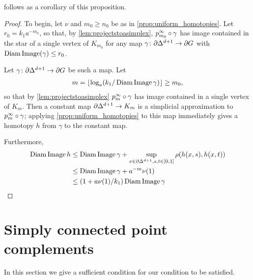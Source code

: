 \documentclass[a4paper]{article}
\begin{document}
 follows as a corollary of this proposition.

\ddagimpliesLCd*

\begin{proof}
  To begin, let $\nu$ and $m_0 \geq n_0$ be as in
  \cref{prop:uniform_homotopies}. Let $r_0 =
  k_1a^{-m_0}$, so that, by \cref{lem:projectstoasimplex},
  $p^\infty_{m_0}\circ\gamma$ has image contained in the star of a single
  vertex of $K_{m_0}$ for any map $\gamma\colon\partial\Delta^{d+1}\to\partial
  G$ with $\operatorname{Diam}\operatorname{Image}(\gamma)\leq r_0$.

  Let $\gamma\colon\partial\Delta^{d+1}\to\partial G$ be such a map. Let 
  \begin{align*}
    m = \lfloor\log_a(k_1/\operatorname{Diam}\operatorname{Image}\gamma)\rfloor \geq m_0,
  \end{align*}
  so that by \cref{lem:projectstoasimplex} $p^\infty_{m}\circ\gamma$ has
  image contained in a single vertex of $K_m$. Then a constant map
  $\partial\Delta^{d+1} \to K_m$ is a simplicial approximation to
  $p^\infty_m\circ\gamma$; applying \cref{prop:uniform_homotopies} to
  this map immediately gives a homotopy $h$ from $\gamma$ to the constant map.

  Furthermore,
  \begin{align*}
    \operatorname{Diam}\operatorname{Image} h &\leq \operatorname{Diam}\operatorname{Image}\gamma + \sup_{x \in\partial\Delta^{d+1}, s,t \in [0,1]} \rho(h(x,s), h(x,t)) \\
                  &\leq \operatorname{Diam}\operatorname{Image}\gamma + a^{-m} \nu(1) \\
                  &\leq (1 + a\nu(1)/k_1) \operatorname{Diam}\operatorname{Image}\gamma \qedhere
  \end{align*}
\end{proof}

\section{Simply connected point complements}

In this section we give a sufficient condition for our condition
 to be satisfied.


\end{document}
